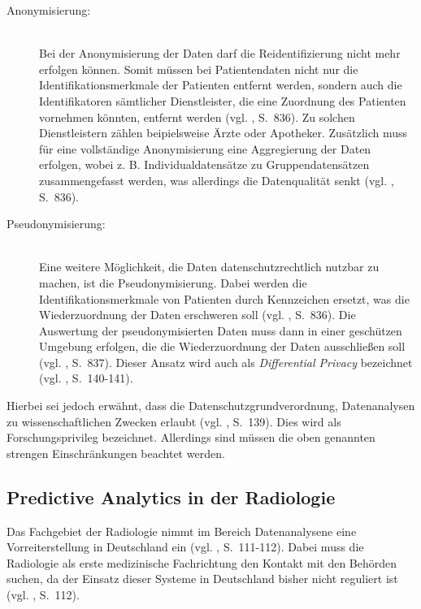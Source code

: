 \begin{description}

\item[Anonymisierung:] \hfill \\
Bei der Anonymisierung der Daten darf die Reidentifizierung nicht mehr erfolgen können.
Somit müssen bei Patientendaten nicht nur die Identifikationsmerkmale der Patienten entfernt werden, sondern
auch die Identifikatoren sämtlicher Dienstleister, die eine Zuordnung des Patienten vornehmen könnten,
entfernt werden (vgl. \cite{Weichert}, S.~836). Zu solchen Dienstleistern zählen beipielsweise Ärzte oder Apotheker.
Zusätzlich muss für eine vollständige Anonymisierung eine Aggregierung der Daten erfolgen, wobei z. B. Individualdatensätze
zu Gruppendatensätzen zusammengefasst werden, was allerdings die Datenqualität senkt (vgl. \cite{Weichert}, S.~836).

\item[Pseudonymisierung:] \hfill \\
Eine weitere Möglichkeit, die Daten datenschutzrechtlich nutzbar zu machen, ist die Pseudonymisierung.
Dabei werden die Identifikationsmerkmale von Patienten durch Kennzeichen ersetzt, was die Wiederzuordnung der Daten
erschweren soll (vgl. \cite{Weichert}, S.~836). Die Auswertung der pseudonymisierten Daten muss dann in einer geschützen
Umgebung erfolgen, die die Wiederzuordnung der Daten ausschließen soll (vgl. \cite{Weichert}, S.~837).
Dieser Ansatz wird auch als \emph{Differential Privacy} bezeichnet (vgl. \cite{Jorzig}, S.~140-141).

\end{description}

Hierbei sei jedoch erwähnt, dass die Datenschutzgrundverordnung, Datenanalysen zu wissenschaftlichen Zwecken erlaubt
(vgl. \cite{Jorzig}, S.~139). Dies wird als Forschungsprivileg bezeichnet. Allerdings sind müssen die oben genannten
strengen Einschränkungen beachtet werden.

\subsection{Predictive Analytics in der Radiologie}

Das Fachgebiet der Radiologie nimmt im Bereich Datenanalysene eine Vorreiterstellung in Deutschland ein (vgl. \cite{Jorzig}, S.~111-112).
Dabei muss die Radiologie als erste medizinische Fachrichtung den Kontakt mit den Behörden suchen, da der Einsatz
dieser Systeme in Deutschland bisher nicht reguliert ist (vgl. \cite{Jorzig}, S.~112).

